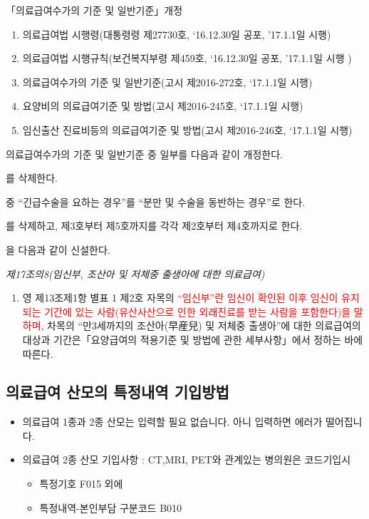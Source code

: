 \begin{commentbox}{「의료급여수가의 기준 및 일반기준」개정}
\begin{enumerate}[1)]\tightlist
\item 의료급여법 시행령(대통령령 제27730호, ‘16.12.30일 공포, ’17.1.1일 시행)
\item 의료급여법 시행규칙(보건복지부령 제459호, ‘16.12.30일 공포, ’17.1.1일 시행 )
\item 의료급여수가의 기준 및 일반기준(고시 제2016-272호, ‘17.1.1일 시행)
\item 요양비의 의료급여기준 및 방법(고시 제2016-245호, ‘17.1.1일 시행)
\item 임신\cntrdot{}출산 진료비등의 의료급여기준 및 방법(고시 제2016-246호, ‘17.1.1일 시행)
\end{enumerate}

의료급여수가의 기준 및 일반기준 중 일부를 다음과 같이 개정한다.
\begin{description}\tightlist
\item[제4조]를 삭제한다.
\item[제5조제1항제1호] 중 “긴급수술을 요하는 경우”를 “분만 및 수술을 동반하는 경우”로 한다. 
\item[제5조제1항제2호] 를 삭제하고, 제3호부터 제5호까지를 각각 제2호부터 제4호까지로 한다.
\item[제17조의8]을 다음과 같이 신설한다.
\end{description}
\emph{제17조의8(임신부, 조산아 및 저체중 출생아에 대한 의료급여)}
\begin{enumerate}[①]\tightlist
\item 영 제13조제1항 별표 1 제2호 자목의 \textcolor{red}{“임신부”란 임신이 확인된 이후 임신이 유지되는 기간에 있는 사람(유산\cntrdot{}사산으로 인한 외래진료를 받는 사람을 포함한다)을 말하며}, 차목의 “만3세까지의 조산아(早産兒) 및 저체중 출생아”에 대한 의료급여의 대상과 기간은「요양급여의 적용기준 및 방법에 관한 세부사항」에서 정하는 바에 따른다.
\end{enumerate}
\end{commentbox}
\prezi{\clearpage}
\subsection{의료급여 산모의 특정내역 기입방법}
\begin{itemize}\tightlist
\item 의료급여 1종과 2종 산모는 입력할 필요 없습니다. 아니 입력하면 에러가 떨어집니다.
\item 의료급여 2종 산모 기입사항 : CT,MRI, PET와 관계있는 병의원은 코드기입시 
	\begin{itemize}\tightlist
	\item 특정기호 F015 외에
	\item 특정내역-본인부담 구분코드 B010
	\end{itemize}
\end{itemize}	

 
